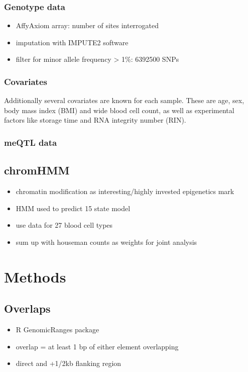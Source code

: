 \documentclass[a4paper,12pt]{article}
\begin{document}
\subsubsection{Genotype data}
\begin{itemize}
\item AffyAxiom array: number of sites interrogated
\item imputation with IMPUTE2 software
\item filter for minor allele frequency > 1\%: 6392500 SNPs 

\end{itemize}

\subsubsection{Covariates}
Additionally several covariates are known for each sample. These are age, sex, body mass index (BMI) and wide blood cell count, as well as experimental factors like storage time and RNA integrity number (RIN).


\subsubsection{meQTL data}

\subsection{chromHMM}
\begin{itemize}
\item chromatin modification as interesting/highly invested epigenetics mark
\item HMM used to predict 15 state model
\item use data for 27 blood cell types
\item sum up with houseman counts as weights for joint analysis
\end{itemize}

\section{Methods}
\subsection{Overlaps}
\begin{itemize}
\item R GenomicRanges package
\item overlap = at least 1 bp of either element overlapping
\item direct and +1/2kb flanking region
\end{itemize}
\end{document}

